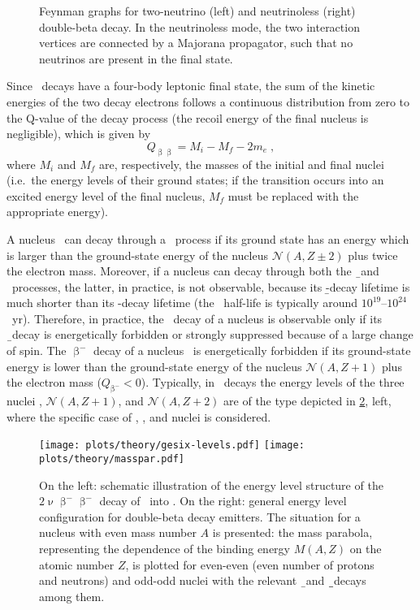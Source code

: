 \begin{figure}
  \centering%
  \caption{%
    Feynman graphs for two-neutrino (left) and neutrinoless (right) double-beta decay. In
    the neutrinoless mode, the two interaction vertices are connected by a Majorana
    propagator, such that no neutrinos are present in the final state.
  }\label{fig:nbb:feydiag}
\end{figure}

Since \nnbb\ decays have a four-body leptonic final state, the sum of the kinetic
energies of the two decay electrons follows a continuous distribution from zero to the
Q-value of the decay process (the recoil energy of the final nucleus is negligible), which
is given by
\[
  Q_{\upbeta\upbeta} = M_i - M_f - 2m_e \;,
\]
where $M_i$ and $M_f$ are, respectively, the masses of the initial and final nuclei
(i.e.~the energy levels of their ground states; if the transition occurs into an excited
energy level of the final nucleus, $M_f$ must be replaced with the appropriate energy).

A nucleus \NAZ\ can decay through a \nnbb\ process if its ground state has an energy which
is larger than the ground-state energy of the nucleus $\mathcal{N}(A,Z\pm2)$ plus twice
the electron mass. Moreover, if a nucleus can decay through both the \b\ and \nnbb\
processes, the latter, in practice, is not observable, because its \b-decay lifetime is
much shorter than its \nnbb-decay lifetime (the \nnbb\ half-life is typically around
$10^{19}$--$10^{24}$~yr). Therefore, in practice, the \nnbb\ decay of a nucleus is observable
only if its \b\ decay is energetically forbidden or strongly suppressed because of a large
change of spin. The $\upbeta^-$ decay of a nucleus \NAZ\ is energetically forbidden if its
ground-state energy is lower than the ground-state energy of the nucleus
$\mathcal{N}(A,Z+1)$ plus the electron mass ($Q_{\upbeta^{-}} < 0$).  Typically, in
\nnbbm\ decays the energy levels of the three nuclei \NAZ, $\mathcal{N}(A,Z+1)$, and
$\mathcal{N}(A,Z+2)$ are of the type depicted in \cref{fig:nbb:gesixlevels}, left, where
the specific case of \gesix, \nuc{As}{76}, and \nuc{Se}{76} nuclei is considered.

\begin{figure}
  \centering
  \texttt{[image: plots/theory/gesix-levels.pdf]}%
  \texttt{[image: plots/theory/masspar.pdf]}%
  \caption{%
    On the left: schematic illustration of the energy level structure of the
    $2\upnu\upbeta^-\upbeta^-$ decay of \gesix\ into \nuc{Se}{76}. On the right: general
    energy level configuration for double-beta decay emitters.  The situation for a
    nucleus with even mass number $A$ is presented: the mass parabola, representing the
    dependence of the binding energy $M(A,Z)$ on the atomic number $Z$, is plotted for
    even-even (even number of protons and neutrons) and odd-odd nuclei with the relevant
    \b\ and \b\b\ decays among them.
  }\label{fig:nbb:gesixlevels}
\end{figure}

